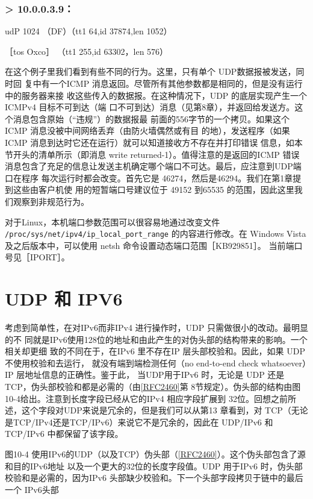 \subsubsection{> 10.0.0.3.9：}
udP 1024 （DF）（tt1 64,id 37874,len 1052）

［tos Oxco］ （tt1 255,id 63302，len 576）

在这个例子里我们看到有些不同的行为。这里，只有单个 UDP数据报被发送，同时回
复中有一个ICMP 消息返回。尽管所有其他参数都是相同的，但是没有运行中的服务器来接
收这些传入的数据报。在这种情况下，UDP 的底层实现产生一个 ICMPv4 目标不可到达（端
口不可到达）消息（见第8章），并返回给发送方。这个消息包含原始（“违规”）的数据报最
前面的556字节的一个拷贝。如果这个ICMP 消息没被中间网络丢弃（由防火墙偶然或有目
的地），发送程序（如果ICMP 消息到达时它还在运行）就可以知道接收方不存在并打印错误
信息，如本节开头的清单所示（即消息 write returned-1）。值得注意的是返回的ICMP 错误
消息包含了充足的信息让发送主机确定哪个端口不可达。最后，应注意到UDP端口在程序
每次运行时都会改变。首先它是 46274，然后是46294。我们在第1章提到这些由客户机使
用的短暂端口号建议位于 49152 到65535 的范围，因此这里我们观察到非规范行为。

\begin{tcolorbox}
    对于Linux，本机端口参数范围可以很容易地通过改变文件 \verb|/proc/sys/net/ipv4/ip_local_port_range|
    的内容进行修改。在 Windows Vista及之后版本中，可以使用 netsh 命令设置动态端口范围［KB929851］。
    当前端口号见［IPORT］。
\end{tcolorbox}

\section{UDP 和 IPV6}
考虑到简单性，在对IPv6而非IPv4 进行操作时，UDP 只需做很小的改动。最明显的不
同就是IPv6使用128位的地址和由此产生的对伪头部的结构带来的影响。一个相关却更细
致的不同在于，在IPv6 里不存在IP 层头部校验和。因此，如果 UDP 不使用校验和去运行，
就没有端到端检测任何（no end-to-end check whatsoever）IP 层地址信息的正确性。鉴于此，
当UDP用于IPv6 时，无论是 UDP 还是TCP，伪头部校验和都是必需的（由\href{https://www.rfc-editor.org/rfc/rfc2460}{[RFC2460]}第
8节规定）。伪头部的结构由图10-4给出。注意到长度字段已经从它的IPv4 相应字段扩展到
32位。回想之前所述，这个字段对UDP来说是冗余的，但是我们可以从第13 章看到，对
TCP（无论是TCP/IPv4还是TCP/IPv6）来说它不是冗余的，因此在 UDP/IPv6 和 TCP/IPv6
中都保留了该字段。

图10-4 使用IPv6的UDP（以及TCP）伪头部（\href{https://www.rfc-editor.org/rfc/rfc2460}{[RFC2460]}）。这个伪头部包含了源和目的IPv6地址
以及一个更大的32位的长度字段值。UDP 用于IPv6 时，伪头部校验和是必需的，因为IPv6
头部缺少校验和。下一个头部字段拷贝于链中的最后一个 IPv6头部

